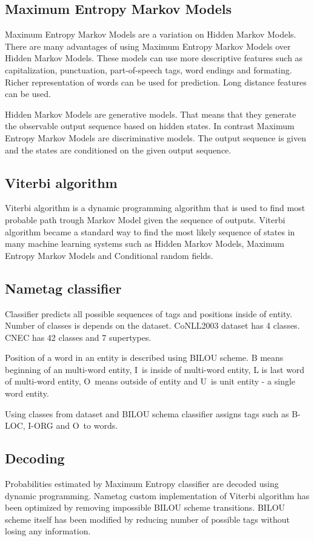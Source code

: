 \documentclass[thesis=B,english]{FITthesis}[2012/10/20]
\begin{document}
\subsection{Maximum Entropy Markov Models}
Maximum Entropy Markov Models are a variation on Hidden Markov Models. There are many advantages of using Maximum Entropy Markov Models over Hidden Markov Models. These models can use more descriptive features such as capitalization, punctuation, part-of-speech tags, word endings and formating. Richer representation of words can be used for prediction. Long distance features can be used.  
\par Hidden Markov Models are generative models. That means that they generate the observable output sequence based on hidden states. In contrast Maximum Entropy Markov Models are discriminative models. The output sequence is given and the states are conditioned on the given output sequence.

\subsection{Viterbi algorithm}
Viterbi algorithm is a dynamic programming algorithm that is used to find most probable path trough Markov Model given the sequence of outputs. Viterbi algorithm became a standard way to find the most likely sequence of states in many machine learning systems such as Hidden Markov Models, Maximum Entropy Markov Models and Conditional random fields. 

\subsection{Nametag classifier} \label{bilou}
Classifier predicts all possible sequences of tags and positions inside of entity. Number of classes is depends on the dataset. CoNLL2003 dataset has 4 classes. CNEC has 42 classes and 7 supertypes.
\par Position of a word in an entity is described using BILOU scheme. B means beginning of an multi-word entity, I~is inside of multi-word entity, L is last word of multi-word entity, O~means outside of entity and U~is unit entity - a single word entity. 
\par Using classes from dataset and BILOU schema classifier assigns tags such as B-LOC, I-ORG and O~to words.

\subsection{Decoding}
Probabilities estimated by Maximum Entropy classifier are decoded using dynamic programming. Nametag custom implementation of Viterbi algorithm has been optimized by removing impossible BILOU scheme transitions. BILOU scheme itself has been modified by reducing number of possible tags without losing any information. 
\end{document}
